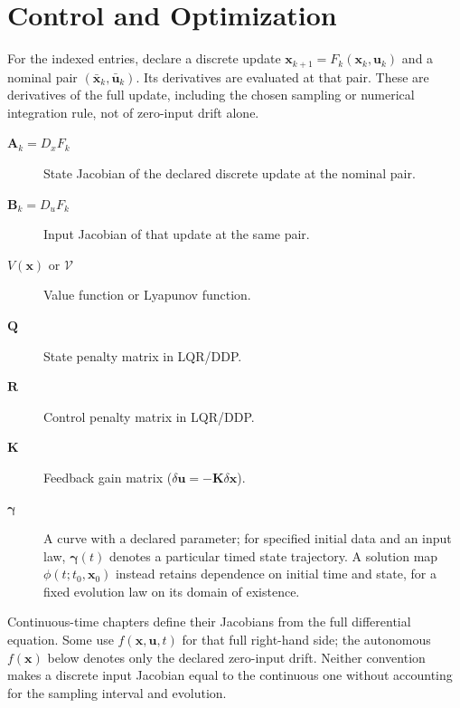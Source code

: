 \section*{Control and Optimization}
For the indexed entries, declare a discrete update
$\mathbf{x}_{k+1}=F_k(\mathbf{x}_k,\mathbf{u}_k)$ and a nominal pair
$(\bar{\mathbf{x}}_k,\bar{\mathbf{u}}_k)$. Its derivatives are evaluated at
that pair. These are derivatives of the full update, including the chosen
sampling or numerical integration rule, not of zero-input drift alone.
\begin{description}
    \item[$\mathbf{A}_k = D_x F_k$] State Jacobian of the declared discrete update at the nominal pair.
    \item[$\mathbf{B}_k = D_u F_k$] Input Jacobian of that update at the same pair.
    \item[$V(\mathbf{x})$ or $\mathcal{V}$] Value function or Lyapunov function.
    \item[$\mathbf{Q}$] State penalty matrix in LQR/DDP.
    \item[$\mathbf{R}$] Control penalty matrix in LQR/DDP.
    \item[$\mathbf{K}$] Feedback gain matrix ($\delta\mathbf{u} = -\mathbf{K}\delta\mathbf{x}$).
    \item[$\boldsymbol{\gamma}$] A curve with a declared parameter; for specified initial data and an input law, $\boldsymbol{\gamma}(t)$ denotes a particular timed state trajectory. A solution map $\phi(t;t_0,\mathbf{x}_0)$ instead retains dependence on initial time and state, for a fixed evolution law on its domain of existence.
\end{description}

Continuous-time chapters define their Jacobians from the full differential
equation. Some use $f(\mathbf{x},\mathbf{u},t)$ for that full right-hand side;
the autonomous $f(\mathbf{x})$ below denotes only the declared zero-input drift.
Neither convention makes a discrete input Jacobian equal to the continuous
one without accounting for the sampling interval and evolution.

